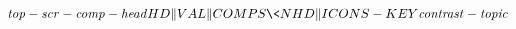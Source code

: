 \documentclass[a4paper]{article}
\begin{document}
\begin{avm}
\[ {\it top-scr-comp-head} \\
   HD\|VAL\|COMPS \< \> \\  
   NHD\|ICONS-KEY {\it contrast-topic} \\ \] 
\end{avm}
\end{document}
